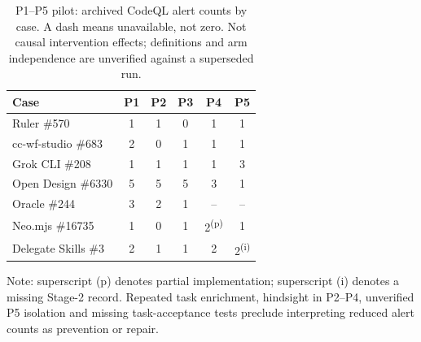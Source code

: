 \begin{table}[H]
\caption{P1--P5 pilot: archived CodeQL alert counts by case. A dash means unavailable, not zero. Not causal intervention effects; definitions and arm independence are unverified against a superseded run.}
\label{tab:p1p5}
\small
\begin{tabular}{@{}lccccc@{}}
\toprule
\textbf{Case} & \textbf{P1} & \textbf{P2} & \textbf{P3} & \textbf{P4} & \textbf{P5}\\
\midrule
Ruler \#570 & 1&1&0&1&1\\
cc-wf-studio \#683 & 2&0&1&1&1\\
Grok CLI \#208 & 1&1&1&1&3\\
Open Design \#6330 & 5&5&5&3&1\\
Oracle \#244 & 3&2&1&--&--\\
Neo.mjs \#16735 & 1&0&1&2\textsuperscript{(p)}&1\\
Delegate Skills \#3 & 2&1&1&2&2\textsuperscript{(i)}\\
\bottomrule
\end{tabular}
\par\smallskip\raggedright\footnotesize Note: superscript (p) denotes partial implementation; superscript (i) denotes a missing Stage-2 record. Repeated task enrichment, hindsight in P2--P4, unverified P5 isolation and missing task-acceptance tests preclude interpreting reduced alert counts as prevention or repair.
\end{table}

{}

